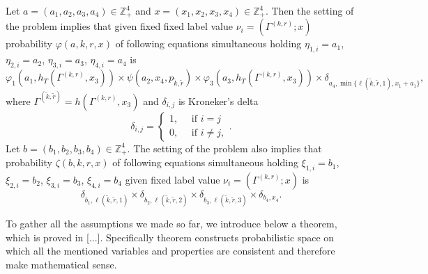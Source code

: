 \documentclass[10pt]{article}
\begin{document}
Let $a=(a_1, a_2, a_3, a_4) \in \mathbb{Z}_+^4$ and $x=(x_1, x_2, x_3, x_4) \in \mathbb{Z}_+^4$. Then the setting of the problem implies that given fixed fixed label value $\nu_i=(\Gamma^{(k,r)}; x)$ probability $\varphi(a,k,r,x)$ of following equations simultaneous holding $\eta_{1,i}=a_1$, $\eta_{2,i}=a_2$, $\eta_{3,i}=a_3$, $\eta_{4,i}=a_4$ is
\begin{equation}
\varphi_1(a_1,h_T(\Gamma^{(k,r)},x_3)) \times \psi(a_2,x_4, p_{\tilde{k},\tilde{r}}) \times \varphi_3(a_3,h_T(\Gamma^{(k,r)},x_3))
\times \delta_{a_4,\min{\{\ell(\tilde{k},\tilde{r},1), x_1+a_1}\}},
\label{conditionProbOne}
\end{equation}
where $\Gamma^{(\tilde{k},\tilde{r})}=h(\Gamma^{(k,r)},x_3)$ and $\delta_{i,j}$ is Kroneker's delta
\begin{equation*}
\delta_{i,j}=\begin{cases} 1, \quad \text{ if }i=j\\0, \quad \text{ if } i\neq j,
\end{cases}.
\end{equation*}
Let $b=(b_1, b_2, b_3, b_4) \in \mathbb{Z}_+^4$. The setting of the problem also implies that probability $\zeta(b, k, r, x)$  of following equations simultaneous holding $\xi_{1,i}=b_1$, $\xi_{2,i}=b_2$, $\xi_{3,i}=b_3$, $\xi_{4,i}=b_4$ given fixed label value $\nu_i=(\Gamma^{(k,r)}; x)$ is
\begin{equation}
\delta_{b_1,\ell(\tilde{k},\tilde{r},1)} \times \delta_{b_2,\ell(\tilde{k},\tilde{r},2)} \times 
\delta_{b_3,\ell(\tilde{k},\tilde{r},3)} \times \delta_{b_4,x_4}.
\label{conditionProbTwo}
\end{equation}

To gather all the assumptions we made so far, we introduce below a theorem, which is proved in [...]. Specifically theorem constructs probabilistic space on which all the mentioned variables and properties are consistent and therefore make mathematical sense.
\end{document}
